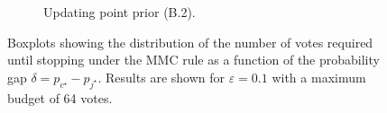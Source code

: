 \begin{figure}[h!]
\begin{subfigure}{0.49\textwidth}
        \caption{Updating point prior (B.2).}
      \label{fig:votes_delta_dirac_prior_ratio_updates}
  \end{subfigure}
  \caption{Boxplots showing the distribution of the number of votes required until stopping under the MMC rule as a function of the probability gap $\delta = p_{c^\star}- p_{j^\star}$. Results are shown for $\varepsilon = 0.1$ with a maximum budget of 64 votes.}
  \label{fig:synthetic_data_stopping_rule}
\end{figure}
